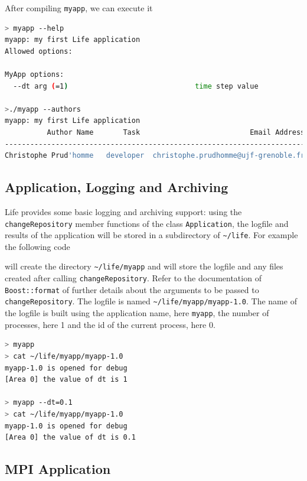 \documentclass[11pt]{article}
\begin{document}


After compiling \lstinline!myapp!, we can execute it

\begin{lstlisting}[language=sh]
> myapp --help
myapp: my first Life application
Allowed options:

MyApp options:
  --dt arg (=1)                              time step value

>./myapp --authors
myapp: my first Life application
          Author Name       Task                          Email Address
-----------------------------------------------------------------------
Christophe Prud'homme   developer  christophe.prudhomme@ujf-grenoble.fr
\end{lstlisting}

\subsection{Application, Logging and Archiving}
\label{sec:appl-logg-arch}

Life provides some basic logging and archiving support: using the
\lstinline!changeRepository! member functions of the class
\lstinline!Application!, the logfile and results of the application
will be stored in a subdirectory of \lstinline!~/life!. For
example the following code



will create the directory \lstinline!~/life/myapp! and will store the
logfile and any files created after calling
\lstinline!changeRepository!. Refer to the documentation of
\lstinline!Boost::format! of further details about the arguments to be
passed to \lstinline!changeRepository!. The logfile is named
\lstinline!~/life/myapp/myapp-1.0!. The name of the logfile is built
using the application name, here \lstinline!myapp!, the number of
processes, here 1 and the id of the current process, here 0.

\begin{lstlisting}[language=sh]
> myapp
> cat ~/life/myapp/myapp-1.0
myapp-1.0 is opened for debug
[Area 0] the value of dt is 1

> myapp --dt=0.1
> cat ~/life/myapp/myapp-1.0
myapp-1.0 is opened for debug
[Area 0] the value of dt is 0.1
\end{lstlisting}

\subsection{MPI Application}
\end{document}
